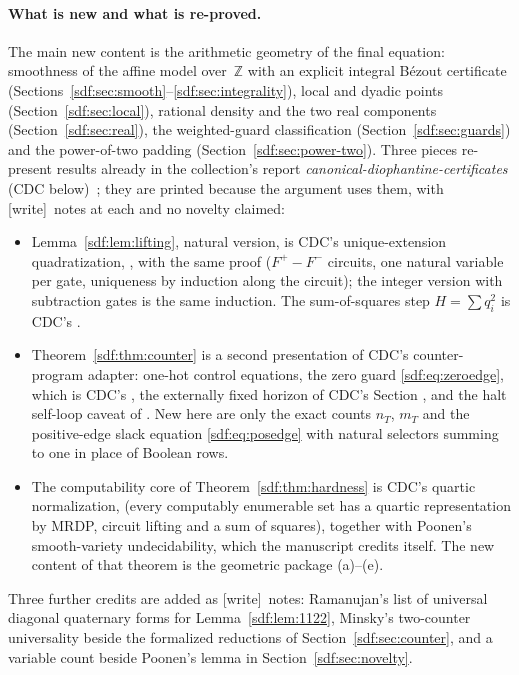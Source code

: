 \documentclass[11pt,a4paper]{article}
\theoremstyle{definition}
\theoremstyle{remark}
\newcommand{\Z}{\mathbb Z}
\newcommand{\wtag}{\textup{[write]}}
\begin{document}
\paragraph{What is new and what is re-proved.} The main new content is the
arithmetic geometry of the final equation: smoothness of the affine model
over~$\Z$ with an explicit integral B\'ezout certificate
(Sections~\ref{sdf:sec:smooth}--\ref{sdf:sec:integrality}), local and dyadic
points (Section~\ref{sdf:sec:local}), rational density and the two real
components (Section~\ref{sdf:sec:real}), the weighted-guard classification
(Section~\ref{sdf:sec:guards}) and the power-of-two padding
(Section~\ref{sdf:sec:power-two}). Three pieces re-present results already in
the collection's report \emph{canonical-diophantine-certificates} (CDC
below)~\cite{cdcreport}; they are printed because the argument uses them, with
\wtag\ notes at each and no novelty claimed:
\begin{itemize}
\item Lemma~\ref{sdf:lem:lifting}, natural version, is CDC's unique-extension
quadratization, , with the same proof
($F^+-F^-$ circuits, one natural variable per gate, uniqueness by induction
along the circuit); the integer version with subtraction gates is the same
induction. The sum-of-squares step $H=\sum q_i^2$ is CDC's
.
\item Theorem~\ref{sdf:thm:counter} is a second presentation of CDC's
counter-program adapter: one-hot control equations, the zero guard
\eqref{sdf:eq:zeroedge}, which is CDC's , the
externally fixed horizon of CDC's Section , and
the halt self-loop caveat of . New here are
only the exact counts $n_T$, $m_T$ and the positive-edge slack equation
\eqref{sdf:eq:posedge} with natural selectors summing to one in place of
Boolean rows.
\item The computability core of Theorem~\ref{sdf:thm:hardness} is CDC's
quartic normalization,  (every computably
enumerable set has a quartic representation by MRDP, circuit lifting and a
sum of squares), together with Poonen's smooth-variety undecidability, which
the manuscript credits itself. The new content of that theorem is the
geometric package (a)--(e).
\end{itemize}
Three further credits are added as \wtag\ notes: Ramanujan's list of
universal diagonal quaternary forms for Lemma~\ref{sdf:lem:1122}, Minsky's
two-counter universality beside the formalized reductions of
Section~\ref{sdf:sec:counter}, and a variable count beside Poonen's lemma in
Section~\ref{sdf:sec:novelty}.
\end{document}
